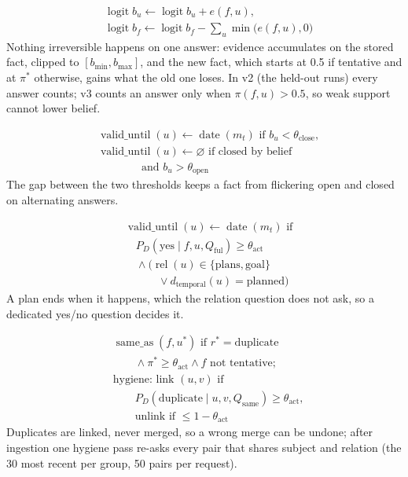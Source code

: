 \documentclass[11pt]{article}
\newcommand{\src}[1]{}
\begin{document}
\begin{align}
& \operatorname{logit} b_u \leftarrow \operatorname{logit} b_u + e(f,u), \nonumber\\
& \operatorname{logit} b_f \leftarrow \operatorname{logit} b_f - \textstyle\sum_{u} \min\bigl(e(f,u), 0\bigr) \label{eq:belief}
\end{align}
Nothing irreversible happens on one answer: evidence accumulates on the stored fact, clipped to $[b_{\min}, b_{\max}]$, and the new fact, which starts at 0.5 if tentative and at $\pi^{*}$ otherwise, gains what the old one loses. In v2 (the held-out runs) every answer counts; v3 counts an answer only when $\pi(f,u) > 0.5$, so weak support cannot lower belief.

\begin{align}
& \operatorname{valid\_until}(u) \leftarrow \operatorname{date}(m_t) \text{ if } b_u < \theta_{\text{close}}, \nonumber\\
& \operatorname{valid\_until}(u) \leftarrow \varnothing \text{ if closed by belief} \nonumber\\
& \qquad\qquad \text{and } b_u > \theta_{\text{open}} \label{eq:hyst}
\end{align}
The gap between the two thresholds keeps a fact from flickering open and closed on alternating answers.

\begin{align}
& \operatorname{valid\_until}(u) \leftarrow \operatorname{date}(m_t) \text{ if} \nonumber\\
& \quad P_D(\text{yes} \mid f, u, Q_{\text{ful}}) \ge \theta_{\text{act}} \nonumber\\
& \quad \wedge \bigl(\operatorname{rel}(u) \in \{\text{plans}, \text{goal}\} \nonumber\\
& \qquad\quad \vee d_{\text{temporal}}(u) = \text{planned}\bigr) \label{eq:plan}
\end{align}
A plan ends when it happens, which the relation question does not ask, so a dedicated yes/no question decides it.

\begin{align}
& \operatorname{same\_as}(f, u^{*}) \text{ if } r^{*} = \text{duplicate} \nonumber\\
& \qquad \wedge \pi^{*} \ge \theta_{\text{act}} \wedge f \text{ not tentative}; \nonumber\\
& \text{hygiene: link } (u,v) \text{ if} \nonumber\\
& \qquad P_D(\text{duplicate} \mid u, v, Q_{\text{same}}) \ge \theta_{\text{act}}, \nonumber\\
& \qquad \text{unlink if } \le 1 - \theta_{\text{act}} \label{eq:links}
\end{align}
Duplicates are linked, never merged, so a wrong merge can be undone; after ingestion one hygiene pass re-asks every pair that shares subject and relation (the 30\src{src/engram/pipeline/hygiene.py (MAX\_GROUP)} most recent per group, 50\src{src/engram/pipeline/hygiene.py} pairs per request).
\end{document}
